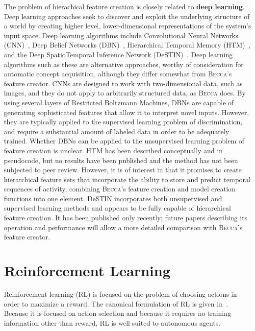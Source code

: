 The problem of hierachical feature creation is closely related to {\bf deep learning}.~\cite{arel10} Deep learning approaches seek to discover and exploit the underlying structure of a world by creating higher level, lower-dimensional representations of the system's input space. Deep learning algorithms include Convolutional Neural Networks (CNN)~\cite{lecun98}, Deep Belief Networks (DBN)~\cite{hinton06,fasel10b}, Hierarchical Temporal Memory (HTM)~\cite{hawkins11}, and the Deep SpatioTemporal Inference Network (DeSTIN)~\cite{arel09}. Deep learning algorithms such as these are alternative approaches, worthy of consideration for automatic concept acquisition, although they differ somewhat from \textsc{Becca}'s feature creator. CNNs are designed to work with two-dimensional data, such as images, and they do not apply to arbitrarily structured data, as \textsc{Becca} does. By using several layers of Restricted Boltzmann Machines, DBNs are capable of generating sophisticated features that allow it to interpret novel inputs. However, they are typically applied to the supervised learning problem of discrimination, and require a substantial amount of labeled data in order to be adequately trained. Whether DBNs can be applied to the unsupervised learning problem of feature creation is unclear. HTM has been described conceptually and in pseudocode, but no results have been published and the method has not been subjected to peer review. However, it is of interest in that it promises to create hierarchical feature sets that incorporate the ability to store and predict temporal sequences of activity, combining \textsc{Becca}'s feature creation and model creation functions into one element. DeSTIN incorporates both unsupervised and supervised learning methods and appears to be fully capable of hierarchical feature creation. It has been published only recently; future papers describing its operation and performance will allow a more detailed comparison with \textsc{Becca}'s feature creator.


\section{Reinforcement Learning}
Reinforcement learning (RL) is focused on the problem of choosing actions in order to maximize a reward. The canonical formulation of RL is given in~\cite{sutton98}. Because it is focused on action selection and because it requires no training information other than reward, RL is well suited to autonomous agents.

